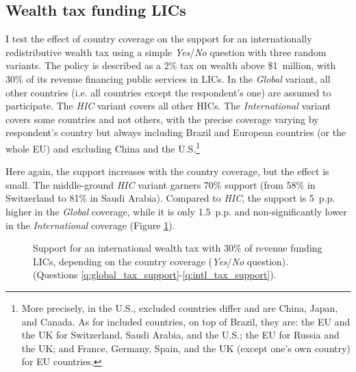 \documentclass[12pt,english]{article}
\begin{document}
\begin{bibunit}
\subsection{Wealth tax funding LICs}\label{subsec:wealth_tax}

I test the effect of country coverage on the support for an internationally redistributive wealth tax using a simple \textit{Yes}/\textit{No} question with three random variants. The policy is described as a 2\% tax on wealth above \$1~million, with 30\% of its revenue financing public services in LICs. In the \textit{Global} variant, all other countries (i.e. all countries except the respondent's one) are assumed to participate. The \textit{HIC} variant covers all other HICs. The \textit{International} variant covers some countries and not others, with the precise coverage varying by respondent's country but always including Brazil and European countries (or the whole EU) and excluding China and the U.S.\footnote{More precisely, in the U.S., excluded countries differ and are China, Japan, and Canada. As for included countries, on top of Brazil, they are: the EU and the UK for Switzerland, Saudi Arabia, and the U.S.; the EU for Russia and the UK; and France, Germany, Spain, and the UK (except one's own country) for EU countries.}

Here again, the support increases with the country coverage, but the effect is small. The middle-ground \textit{HIC} variant garners 70\% support (from 58\% in Switzerland to 81\% in Saudi Arabia). Compared to \textit{HIC}, the support is 5~p.p. higher in the \textit{Global} coverage, while it is only 1.5~p.p. and non-significantly lower in the \textit{International} coverage (Figure \ref{fig:wealth_tax}). 

\begin{figure}[h!]
    \caption[Support for an international wealth tax depending on country coverage]{Support for an international wealth tax with 30\% of revenue funding LICs, depending on the country coverage (\textit{Yes}/\textit{No} question). \hfill (Questions \ref{q:global_tax_support}-\ref{q:intl_tax_support}).
    }\label{fig:wealth_tax}
\end{figure}


\end{bibunit}
\end{document}
